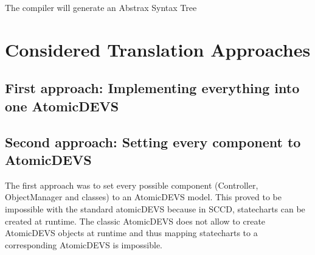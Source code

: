 The compiler will generate an Abstrax Syntax Tree


\section{Considered Translation Approaches}

\subsection{First approach: Implementing everything into one AtomicDEVS}

\subsection{Second approach: Setting every component to AtomicDEVS}

The first approach was to set every possible component (Controller, ObjectManager and classes) to an AtomicDEVS model. This proved to be impossible with the standard
atomicDEVS because in SCCD, statecharts can be created at runtime. The classic AtomicDEVS does not allow to create AtomicDEVS objects at runtime and thus mapping statecharts
to a corresponding AtomicDEVS is impossible.


